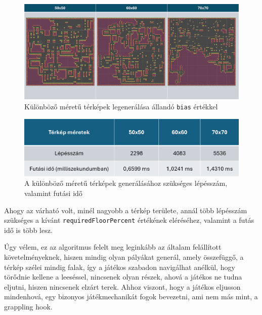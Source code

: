 \begin{figure}[ht]
\centering
\includegraphics[width=\textwidth]{images/fixedbiaschangingmapsize.png}
\caption{Különböző méretű térképek legenerálása állandó \texttt{bias} értékkel}
\label{fig:fixedbiaschangingmapsize}
\end{figure}

\begin{figure}[ht]
\centering
\includegraphics[width=\textwidth]{images/fixedbiaschangingmapsizestepcountruntime.png}
\caption{A különböző méretű térképek generálásához szükséges lépésszám, valamint futási idő}
\label{fig:fixedbiaschangingmapsizeruntimestepcount}
\end{figure}

\newpage
Ahogy az várható volt, minél nagyobb a térkép területe, annál több lépésszám szükséges a kívánt \texttt{requiredFloorPercent} értékének eléréséhez, valamint a futás idő is több lesz.

Úgy vélem, ez az algoritmus felelt meg leginkább az általam felállított követelményeknek, hiszen mindig olyan pályákat generál, amely összefüggő, a térkép szélei mindig falak, így a játékos szabadon navigálhat anélkül, hogy törődnie kellene a leeséssel, nincsenek olyan részek, ahová a játékos ne tudna eljutni, hiszen nincsenek elzárt terek. Ahhoz viszont, hogy a játékos eljusson mindenhová, egy bizonyos játékmechanikát fogok bevezetni, ami nem más mint, a grappling hook.


